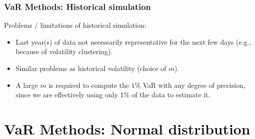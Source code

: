 \begin{frame}%

\frametitle{VaR Methods: Historical simulation}

Problems / limitations of historical simulation:

\begin{itemize}
\item Last year(s) of data not necessarily representative for the next few
days (e.g., because of volatility clustering).

\item Similar problems as historical volatility (choice of $m$).

\item A large $m$ is required to compute the $1\%$ VaR with any degree of
precision, since we are effectively using only 1\% of the data to estimate it.

\end{itemize}

\end{frame}%

\section[Normal Distribution]{VaR Methods: Normal distribution}\subsection*{}

